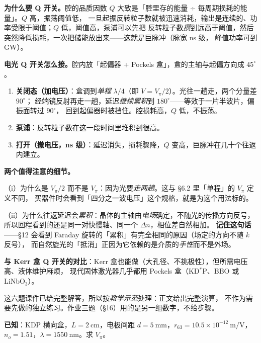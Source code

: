 \documentclass[11pt]{ctexart}
\let\subhdrtheme\subhdr
\renewcommand{\subhdr}[1]{\needspace{3\baselineskip}\subhdrtheme{#1}}
\let\hdrorig\hdr
\renewcommand{\hdr}[2]{\needspace{8\baselineskip}\hdrorig{#1}{#2}}
\begin{document}
\textbf{为什么要 Q 开关。}腔的品质因数 $Q$ 大致是「腔里存的能量 ÷ 每周期损耗的能量」。$Q$ 高，振荡阈值低，
一旦起振反转粒子数就被迅速消耗，输出是连续的、功率受限于阈值；$Q$ 低，阈值高，泵浦可以先把
反转粒子数\emph{攒}到远高于阈值，然后突然降低损耗，一次把储能放出来——这就是巨脉冲（脉宽 ns 级，
峰值功率可到 GW）。

\textbf{电光 Q 开关怎么接。}腔内放「起偏器 + Pockels 盒」，盒的主轴与起偏方向成 $45^\circ$。

\begin{enumerate}
\item \textbf{关闭态（加电压）}：盒调到\emph{单程} $\lambda/4$（即 $V=V_\pi/2$）。光往一趟走，两个分量差 $90^\circ$；
      经端镜反射再走一趟，延迟\emph{继续累积}到 $180^\circ$——等效于一片半波片，偏振面转过 $90^\circ$，
      回到起偏器时被挡住。腔损耗高，$Q$ 低，不振荡。
\item \textbf{泵浦}：反转粒子数在这一段时间里堆积到很高。
\item \textbf{打开（撤电压，ns 级）}：延迟消失，损耗骤降，$Q$ 变高，巨脉冲在几十个往返内建立。
\end{enumerate}

\textbf{两个值得注意的细节。}

（i）为什么是 $V_\pi/2$ 而不是 $V_\pi$：因为光要\emph{走两趟}。这与 §6.2 里「单程」的 $V_\pi$ 定义不同，
买器件时会看到「四分之一波电压」这个规格，就是为这个用法标的。

（ii）为什么往返延迟会\emph{累积}：晶体的主轴由\emph{电场}确定，不随光的传播方向反号，
所以回程看到的还是同一对快慢轴、同一个 $\Delta n$，相位差自然相加。
\textbf{记住这句话}——§12 会看到 Faraday 旋转的「累积」有完全相同的原因（场定的方向不随 $k$ 反号），
而自然旋光的「抵消」正因为它依赖的是介质的\emph{手性}而不是外场。

\textbf{与 Kerr 盒 Q 开关的对比}：Kerr 盒也能做（大孔径、不挑极性），但所需电压高、液体维护麻烦，
现代固体激光器几乎都用 Pockels 盒（KD$^*$P、BBO 或 LiNbO$_3$）。


{\small\color{inkgray}这六题课件已给完整解答，所以按\emph{教学示范}处理：正文给出完整演算，
不作为需要先做的独立练习。作业三题（§16）用的是另一组数字，不给步骤。}


\textbf{已知}：KDP 横向盒，$L=2\ \mathrm{cm}$，电极间距 $d=5\ \mathrm{mm}$，$r_{63}=10.5\times10^{-12}\ \mathrm{m/V}$，
$n_o=1.51$，$\lambda=1550\ \mathrm{nm}$。求 $V_\pi$。
\end{document}
